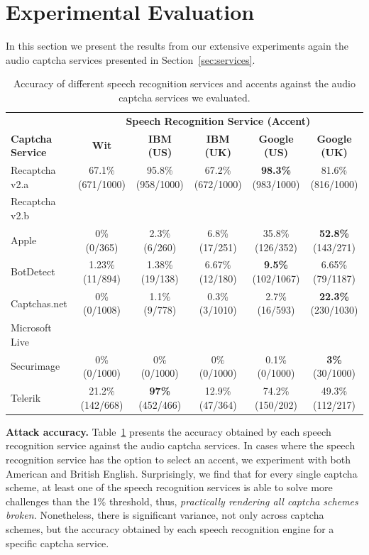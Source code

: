 \section{Experimental Evaluation}
\label{sec:evaluation}

In this section we present the results from our extensive experiments again 
the audio captcha services presented in Section~\ref{sec:services}.

\begin{table}[t]
\centering
\caption{Accuracy of different speech recognition services and accents against the audio captcha services we evaluated.}
\begin{tabular}{lccccc}
\toprule
&\multicolumn{5}{c}{\textbf{Speech Recognition Service (Accent)}}\\
\cmidrule{2-6}
\textbf{Captcha Service}& \textbf{Wit}& \textbf{IBM (US)} & \textbf{ IBM (UK)} & \textbf{Google (US)} & \textbf{Google (UK)} \\
\hline
Recaptcha v2.a & 67.1\% (671/1000) & 95.8\% (958/1000) & 67.2\% (672/1000) & \textbf{98.3\%} (983/1000) & 81.6\% (816/1000) \\
\rowcolor{Gray}
Recaptcha v2.b &  &  &  &  & \\
Apple  & 0\% (0/365)  & 2.3\% (6/260) & 6.8\% (17/251) & 35.8\% (126/352) & \textbf{52.8\%} (143/271) \\
\rowcolor{Gray}
BotDetect  & 1.23\% (11/894)  & 1.38\% (19/138) & 6.67\% (12/180) & \textbf{9.5\%} (102/1067)  & 6.65\% (79/1187) \\
Captchas.net  & 0\% (0/1008) & 1.1\% (9/778)  & 0.3\% (3/1010)  & 2.7\% (16/593) & \textbf{22.3\%} (230/1030) \\
\rowcolor{Gray}
Microsoft Live & &  &  & & \\
Securimage  & 0\% (0/1000)  & 0\% (0/1000) & 0\% (0/1000) & 0.1\% (0/1000) & \textbf{3\%} (30/1000) \\
\rowcolor{Gray}
Telerik  & 21.2\% (142/668)  & \textbf{97\%} (452/466) & 12.9\% (47/364) & 74.2\% (150/202) & 49.3\% (112/217) \\
\bottomrule
\end{tabular}
\label{tab:combinations}
\end{table}

\textbf{Attack accuracy.} Table~\ref{tab:combinations} presents the accuracy obtained by each speech recognition service 
against the audio captcha services. In cases where the speech recognition service has the option to select an accent,
we experiment with both American and British English. Surprisingly, we find that for every single captcha scheme, at least
one of the speech recognition services is able to solve more challenges than the 1\% threshold, thus, \emph{practically 
rendering all captcha schemes broken.} Nonetheless, there is significant variance, not only across captcha schemes, but
the accuracy obtained by each speech recognition engine for a specific captcha service. 

